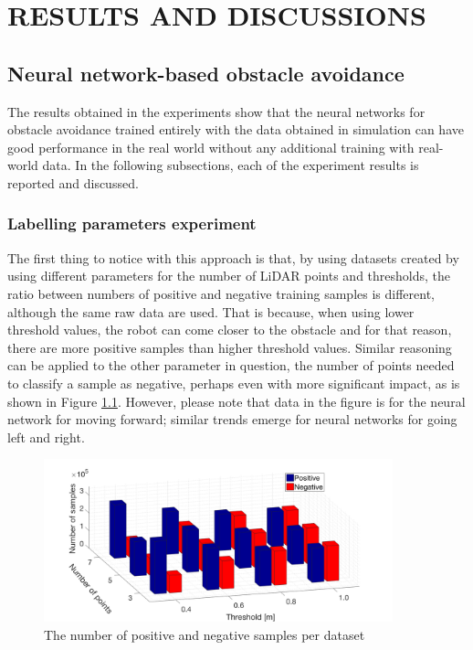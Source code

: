 \chapter{RESULTS AND DISCUSSIONS}
\label{chap:Results}

\section{Neural network-based obstacle avoidance}

The results obtained in the experiments show that the neural networks for obstacle avoidance trained entirely with the data obtained in simulation can have good performance in the real world without any additional training with real-world data. In the following subsections, each of the experiment results is reported and discussed.

\subsection{Labelling parameters experiment}\label{Sec:ResLabelling}

The first thing to notice with this approach is that, by using datasets created by using different parameters for the number of LiDAR points and thresholds, the ratio between numbers of positive and negative training samples is different, although the same raw data are used. That is because, when using lower threshold values, the robot can come closer to the obstacle and for that reason, there are more positive samples than higher threshold values. Similar reasoning can be applied to the other parameter in question, the number of points needed to classify a sample as negative, perhaps even with more significant impact, as is shown in Figure \ref{Fig:Brojevi}. However, please note that data in the figure is for the neural network for moving forward; similar trends emerge for neural networks for going left and right.

\begin{figure}
\centering
\includegraphics[width=0.9\textwidth]{slike/brojevi}
\caption{The number of positive and negative samples per dataset}
\label{Fig:Brojevi}
\end{figure}

